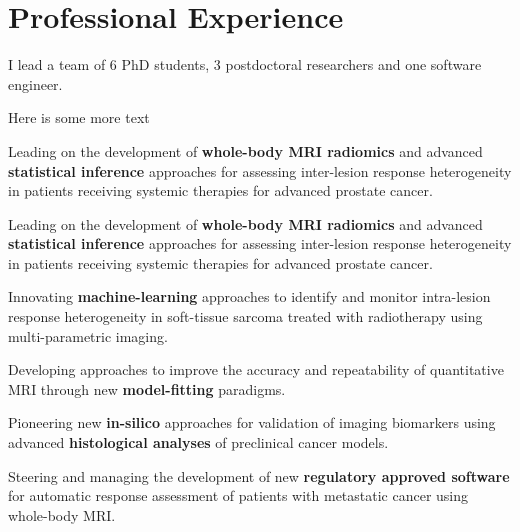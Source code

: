 \documentclass[]{mbcv}
\begin{document}
\begin{minipage}[t]{0.65\textwidth}

\section{Professional Experience}

I lead a team of 6 PhD students, 3 postdoctoral researchers and one software engineer.

Here is some more text

\vspace*{10pt}
\begin{tightemize}

\item Leading on the development of \textbf{whole-body MRI radiomics} and advanced \textbf{statistical inference} approaches for assessing inter-lesion response heterogeneity in patients receiving systemic therapies for advanced prostate cancer.

\end{tightemize}

\sectionsep

\vspace*{10pt}

\begin{tightemize}

\item Leading on the development of \textbf{whole-body MRI radiomics} and advanced \textbf{statistical inference} approaches for assessing inter-lesion response heterogeneity in patients receiving systemic therapies for advanced prostate cancer.

\item Innovating \textbf{machine-learning} approaches to identify and monitor intra-lesion response heterogeneity in soft-tissue sarcoma treated with radiotherapy using multi-parametric imaging.

\item Developing approaches to improve the accuracy and repeatability of quantitative MRI through new \textbf{model-fitting} paradigms.

\item Pioneering new \textbf{in-silico} approaches for validation of imaging biomarkers using advanced \textbf{histological analyses} of preclinical cancer models.

\item Steering and managing the development of new \textbf{regulatory approved software} for automatic response assessment of patients with metastatic cancer using whole-body MRI.


\end{tightemize}
\end{minipage}
\end{document}
